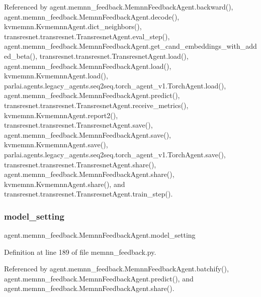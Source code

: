 Referenced by agent.\+memnn\+\_\+feedback.\+Memnn\+Feedback\+Agent.\+backward(), agent.\+memnn\+\_\+feedback.\+Memnn\+Feedback\+Agent.\+decode(), kvmemnn.\+Kvmemnn\+Agent.\+dict\+\_\+neighbors(), transresnet.\+transresnet.\+Transresnet\+Agent.\+eval\+\_\+step(), agent.\+memnn\+\_\+feedback.\+Memnn\+Feedback\+Agent.\+get\+\_\+cand\+\_\+embeddings\+\_\+with\+\_\+added\+\_\+beta(), transresnet.\+transresnet.\+Transresnet\+Agent.\+load(), agent.\+memnn\+\_\+feedback.\+Memnn\+Feedback\+Agent.\+load(), kvmemnn.\+Kvmemnn\+Agent.\+load(), parlai.\+agents.\+legacy\+\_\+agents.\+seq2seq.\+torch\+\_\+agent\+\_\+v1.\+Torch\+Agent.\+load(), agent.\+memnn\+\_\+feedback.\+Memnn\+Feedback\+Agent.\+predict(), transresnet.\+transresnet.\+Transresnet\+Agent.\+receive\+\_\+metrics(), kvmemnn.\+Kvmemnn\+Agent.\+report2(), transresnet.\+transresnet.\+Transresnet\+Agent.\+save(), agent.\+memnn\+\_\+feedback.\+Memnn\+Feedback\+Agent.\+save(), kvmemnn.\+Kvmemnn\+Agent.\+save(), parlai.\+agents.\+legacy\+\_\+agents.\+seq2seq.\+torch\+\_\+agent\+\_\+v1.\+Torch\+Agent.\+save(), transresnet.\+transresnet.\+Transresnet\+Agent.\+share(), agent.\+memnn\+\_\+feedback.\+Memnn\+Feedback\+Agent.\+share(), kvmemnn.\+Kvmemnn\+Agent.\+share(), and transresnet.\+transresnet.\+Transresnet\+Agent.\+train\+\_\+step().

\mbox{\label{classagent_1_1memnn__feedback_1_1MemnnFeedbackAgent_a6b23c35b66b0211a691ed4a9636b10c0}} 
\subsubsection{\texorpdfstring{model\+\_\+setting}{model\_setting}}
{\footnotesize\ttfamily agent.\+memnn\+\_\+feedback.\+Memnn\+Feedback\+Agent.\+model\+\_\+setting}



Definition at line 189 of file memnn\+\_\+feedback.\+py.



Referenced by agent.\+memnn\+\_\+feedback.\+Memnn\+Feedback\+Agent.\+batchify(), agent.\+memnn\+\_\+feedback.\+Memnn\+Feedback\+Agent.\+predict(), and agent.\+memnn\+\_\+feedback.\+Memnn\+Feedback\+Agent.\+share().

